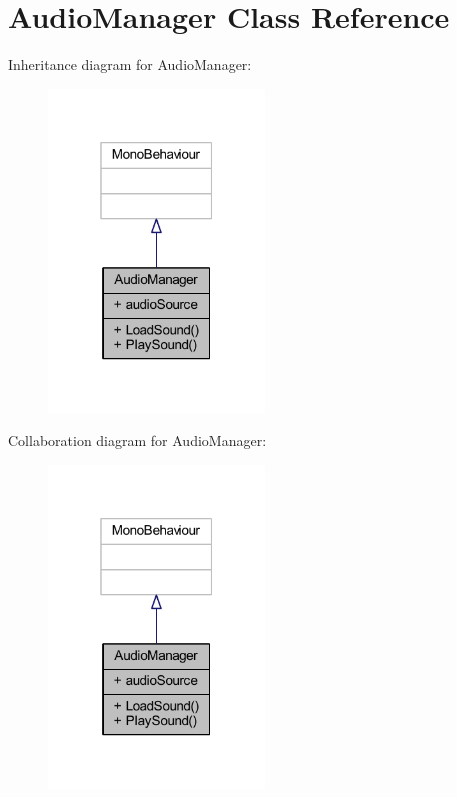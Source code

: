 \hypertarget{class_audio_manager}{}\section{Audio\+Manager Class Reference}
\label{class_audio_manager}


Inheritance diagram for Audio\+Manager\+:
\nopagebreak
\begin{figure}[H]
\begin{center}
\leavevmode
\includegraphics[width=163pt]{class_audio_manager__inherit__graph}
\end{center}
\end{figure}


Collaboration diagram for Audio\+Manager\+:
\nopagebreak
\begin{figure}[H]
\begin{center}
\leavevmode
\includegraphics[width=163pt]{class_audio_manager__coll__graph}
\end{center}
\end{figure}
